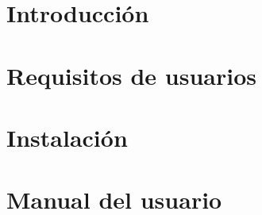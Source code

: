 
\section{Introducción}

\section{Requisitos de usuarios}

\section{Instalación}

\section{Manual del usuario}


